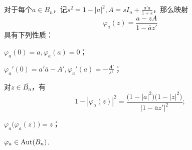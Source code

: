 \begin{theorem}\label{thm9.6.2}
  对于每个$a\in B_n$，记$s^2=1-|a|^2,A=sI_n+\frac{\bar {a'}a}{1+s}$，那么映射
  \[
    \varphi_a(z) = \frac{a-zA}{1-\bar az'}
  \]
  具有下列性质：
  \begin{eenum}
    \item \label{thm9.6.2.1} $\varphi_a(0)=a,\varphi_a(a)=0$；
    \item \label{thm9.6.2.2} $\varphi_a'(0)=a'\bar a-A',\varphi_a'(a)=-\frac{A'}{s^2}；$
    \item \label{thm9.6.2.3} 对$z\in\bar{B_n}$，有
        \[
          1-|\varphi_a(z)|^2 = \frac{\big(1-|a|^2\big)\big(1-|z|^2\big)}{|1-\bar az'|^2};
        \]
    \item \label{thm9.6.2.4} $\varphi_a\big(\varphi_a(z)\big)=z$；
    \item \label{thm9.6.2.5} $\varphi_a\in\operatorname{Aut}(B_n)$.
  \end{eenum}
\end{theorem}
